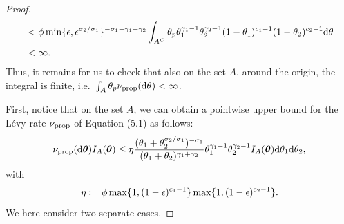 \begin{proof}
\begin{align}
		&<\phi \min\{\epsilon,\epsilon^{\rate{2}/\rate{1}}\}^{-\rate{1}-\corr{1}-\corr{2}} \int_{A^C}  \variantfreqperpop{\popidx} \variantfreqperpop{1}^{\corr{1}-1} \variantfreqperpop{2}^{\corr{2}-1}(1-\variantfreqperpop{1})^{\conc{1}-1}(1-\variantfreqperpop{2})^{\conc{2}-1}\de\vecvariantfreq{} \nonumber \\
		&<\infty. \label{eq:req_p0}
   	 \end{align}
    Thus, it remains for us to check that also on the set $A$, around the origin, the integral is finite, i.e.\ $\int_A \variantfreqperpop{\popidx}\ratemeasproposed(\de\vecvariantfreq{})<\infty$.

    First, notice that on the set $A$, we can obtain a pointwise upper bound for the L\'{e}vy rate $\nu_{\mathrm{prop}}$ of Equation (5.1) as follows:
    \[
    	\nu_{\mathrm{prop}}(\mathrm{d} \boldsymbol{\theta}) I_A(\boldsymbol{\theta}) \le  \eta \frac{(\theta_{1}+\theta_{2}^{\sigma_{2}/\sigma_{1}})^{-\sigma_{1}}}{(\theta_{1}+\theta_{2})^{\gamma_{1}+\gamma_{2}}}\theta_{1}^{\gamma_{1}-1}\theta_{2}^{\gamma_{2}-1} I_A(\boldsymbol{\theta}) \mathrm{d} \theta_{1} \mathrm{d} \theta_{2},
    \]
    with 
    \[
    	\eta := \phi \max\{1, (1-\epsilon)^{c_{1}-1}\} \max\{ 1, (1-\epsilon)^{c_{2}-1}\}.
    \]
    We here consider two separate cases. 
    

\end{proof}

